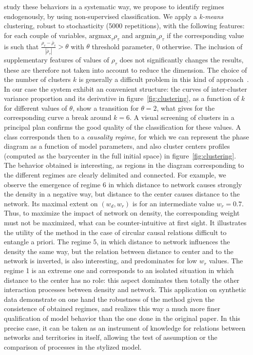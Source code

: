 \documentclass[english]{./sageo}
\begin{document}
study these behaviors in a systematic way, we propose to identify regimes endogenously, by using non-supervised classification. We apply a \emph{k-means} clustering, robust to stochasticity (5000 repetitions), with the following features: for each couple of variables, $\textrm{argmax}_{\tau} \rho_{\tau}$ and $\textrm{argmin}_{\tau} \rho_{\tau}$ if the corresponding value is such that $\frac{\rho_{\tau}-\bar{\rho}_{\tau}}{\left|\bar{\rho}_{\tau}\right|} > \theta$ with $\theta$ threshold parameter, 0 otherwise. The inclusion of supplementary features of values of $\rho_{\tau}$ does not significantly changes the results, these are therefore not taken into account to reduce the dimension. The choice of the number of clusters $k$ is generally a difficult problem in this kind of approach~\cite{hamerly2003learning}. In our case the system exhibit an convenient structure: the curves of inter-cluster variance proportion and its derivative in figure~\ref{fig:clustering}, as a function of $k$ for different values of $\theta$, show a transition for $\theta = 2$, what gives for the corresponding curve a break around $k=6$. A visual screening of clusters in a principal plan confirms the good quality of the classification for these values. A class corresponds then to a \emph{causality regime}, for which we can represent the phase diagram as a function of model parameters, and also cluster centers profiles (computed as the barycenter in the full initial space) in figure~\ref{fig:clustering}. The behavior obtained is interesting, as regions in the diagram corresponding to the different regimes are clearly delimited and connected. For example, we observe the emergence of regime 6 in which distance to network causes strongly the density in a negative way, but distance to the center causes distance to the network. Its maximal extent on $(w_d,w_r)$ is for an intermediate value $w_r=0.7$. Thus, to maximize the impact of network on density, the corresponding weight must not be maximized, what can be counter-intuitive at first sight. It illustrates the utility of the method in the case of circular causal relations difficult to entangle a priori. The regime 5, in which distance to network influences the density the same way, but the relation between distance to center and to the network is inverted, is also interesting, and predominates for low $w_r$ values. The regime 1 is an extreme one and corresponds to an isolated situation in which distance to the center has no role: this aspect dominates then totally the other interaction processes between density and network. This application on synthetic data demonstrate on one hand the robustness of the method given the consistence of obtained regimes, and realizes this way a much more finer qualification of model behavior than the one done in the original paper. In this precise case, it can be taken as an instrument of knowledge for relations between networks and territories in itself, allowing the test of assumption or the comparison of processes in the stylized model.
\end{document}
